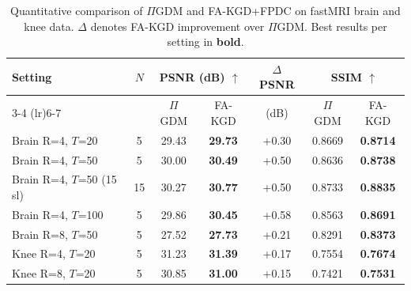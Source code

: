 \begin{table}[t]
\centering
\caption{Quantitative comparison of $\Pi$GDM and FA-KGD+FPDC on fastMRI brain and knee data. $\Delta$ denotes FA-KGD improvement over $\Pi$GDM. Best results per setting in \textbf{bold}.}
\label{tab:results}
\small
\begin{tabular}{lcccccc}
\toprule
Setting & $N$ & \multicolumn{2}{c}{PSNR (dB) $\uparrow$} & $\Delta$PSNR & \multicolumn{2}{c}{SSIM $\uparrow$} \\
\cmidrule(lr){3-4} \cmidrule(lr){6-7}
 & & $\Pi$GDM & FA-KGD & (dB) & $\Pi$GDM & FA-KGD \\
\midrule
Brain R=4, $T$=20 & 5 & 29.43 & \textbf{29.73} & {\color{red}+0.30} & 0.8669 & \textbf{0.8714} \\
Brain R=4, $T$=50 & 5 & 30.00 & \textbf{30.49} & {\color{red}+0.50} & 0.8636 & \textbf{0.8738} \\
Brain R=4, $T$=50 (15 sl) & 15 & 30.27 & \textbf{30.77} & {\color{red}+0.50} & 0.8733 & \textbf{0.8835} \\
Brain R=4, $T$=100 & 5 & 29.86 & \textbf{30.45} & {\color{red}+0.58} & 0.8563 & \textbf{0.8691} \\
Brain R=8, $T$=50 & 5 & 27.52 & \textbf{27.73} & {\color{red}+0.21} & 0.8291 & \textbf{0.8373} \\
Knee R=4, $T$=20 & 5 & 31.23 & \textbf{31.39} & {\color{red}+0.17} & 0.7554 & \textbf{0.7674} \\
Knee R=8, $T$=20 & 5 & 30.85 & \textbf{31.00} & {\color{red}+0.15} & 0.7421 & \textbf{0.7531} \\
\bottomrule
\end{tabular}
\end{table}